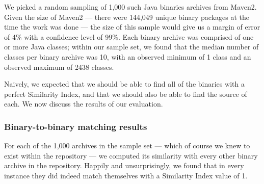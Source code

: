 We picked a random sampling of 1,000 such Java binaries archives from
Maven2. Given the size of Maven2 --- there were 144,049 unique binary
packages at the time the work was done --- the size of this sample would
give us a  margin of error of 4\% with a confidence level of 99\%.  Each
binary archive was comprised of one or more Java classes; within our sample
set, we found that the median number of classes per binary archive was 10,
with an observed minimum of 1 class and an observed maximum of 2438
classes.

Naively, we expected that we should be able to find all of the binaries
with a perfect Similarity Index, and that we should also be able to find
the source of each.  We now discuss the results of our evaluation.


\subsubsection{Binary-to-binary matching results}

For each of the 1,000 archives in the sample set --- which of course we
knew to exist within the repository --- we computed its similarity with
every other binary archive in the repository.  Happily and unsurprisingly,
we found that in every instance they did indeed match themselves with a
Similarity Index value of 1.

